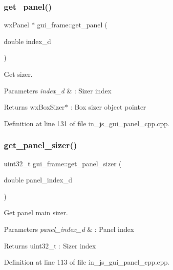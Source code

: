 \subsubsection{get\_panel()}
{\footnotesize\ttfamily wx\+Panel $\ast$ gui\+\_\+frame\+::get\+\_\+panel (\begin{DoxyParamCaption}\item[{double}]{index\+\_\+d }\end{DoxyParamCaption})}



Get sizer. 


\begin{DoxyParams}{Parameters}
{\em index\+\_\+d} & \+: Sizer index \\
\hline
\end{DoxyParams}
\begin{DoxyReturn}{Returns}
wx\+Box\+Sizer$\ast$ \+: Box sizer object pointer 
\end{DoxyReturn}


Definition at line 131 of file in\+\_\+js\+\_\+gui\+\_\+panel\+\_\+cpp.\+cpp.

\mbox{\label{group___panel_gaa1fabcb1dc04e90d5c360790bfd99fae}} 
\subsubsection{get\_panel\_sizer()}
{\footnotesize\ttfamily uint32\+\_\+t gui\+\_\+frame\+::get\+\_\+panel\+\_\+sizer (\begin{DoxyParamCaption}\item[{double}]{panel\+\_\+index\+\_\+d }\end{DoxyParamCaption})}



Get panel main sizer. 


\begin{DoxyParams}{Parameters}
{\em panel\+\_\+index\+\_\+d} & \+: Panel index \\
\hline
\end{DoxyParams}
\begin{DoxyReturn}{Returns}
uint32\+\_\+t \+: Sizer index 
\end{DoxyReturn}


Definition at line 113 of file in\+\_\+js\+\_\+gui\+\_\+panel\+\_\+cpp.\+cpp.

\mbox{\label{group___panel_ga8a9b9e8ae559fde6884131e0bae364fc}} 
